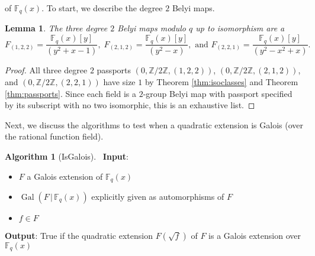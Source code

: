 \documentclass{dcthesis}
\newcommand{\ZZ}{\mathbb Z}
\newcommand{\mm}[1]{{\color{blue} \sf MM: [#1]}}
\newcommand{\FF}{\mathbb{F}}
\DeclareMathOperator{\Gal}{Gal}
\numberwithin{equation}{section}
\newtheorem{lemma}[equation]{Lemma}
\theoremstyle{definition}
\newtheorem{alg}[equation]{Algorithm}
\theoremstyle{remark}
\begin{document}
{{{    of $\FF_q(x)$.
    To start,
    we describe
    the degree $2$ Belyi maps.
    \begin{lemma}
      \label{lem:degree2FF}
      The three degree $2$ Belyi maps
      modulo $q$ up to isomorphism
      are a
      \begin{equation}
        \label{eqn:degree2FF}
        F_{(1,2,2)} =
        \frac{\FF_q(x)[y]}{(y^2 + x - 1)},\;
        F_{(2,1,2)} =
        \frac{\FF_q(x)[y]}{(y^2 - x)},
        \text{ and }
        F_{(2,2,1)} =
        \frac{\FF_q(x)[y]}{(y^2 - x^2 + x)}.
      \end{equation}
    \end{lemma}
    \begin{proof}
      All three degree $2$ passports
      $(0,\ZZ/2\ZZ,(1,2,2))$,
      $(0,\ZZ/2\ZZ,(2,1,2))$, and
      \newline
      $(0,\ZZ/2\ZZ,(2,2,1))$
      have size $1$ by
      Theorem
      \ref{thm:isoclasses}
      and Theorem
      \ref{thm:passports}.
      Since each field is a
      $2$-group Belyi map
      with passport specified
      by its subscript
      with no two isomorphic,
      this is an exhaustive list.
    \end{proof}
    Next, we discuss the algorithms
    to test when a quadratic extension
    is Galois (over the rational function field).
    \begin{alg}[IsGalois]
      \label{alg:isgalois}
      \,
      \newline
      \textbf{Input}:
      \begin{itemize}
        \item
          $F$ a Galois extension of
          $\FF_q(x)$
        \item
          $\Gal(F\,|\,\FF_q(x))$
          explicitly given
          as automorphisms of $F$
        \item
          $f\in F$
      \end{itemize}
      \textbf{Output}:
      \textsf{True} if the quadratic extension
      $F(\sqrt{f})$ of $F$
      is a Galois extension over $\FF_q(x)$

\end{alg}}}}
\end{document}
